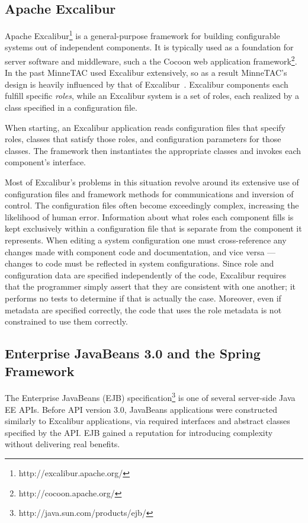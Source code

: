 \documentclass{article}
\begin{document}
\subsection{Apache Excalibur}

Apache Excalibur\footnote{http://excalibur.apache.org/} is a
general-purpose framework for building configurable systems out of
independent components.  It is typically used as a foundation for
server software and middleware, such a the Cocoon web application
framework\footnote{http://cocoon.apache.org/}.  In the past MinneTAC
used Excalibur extensively, so as a result MinneTAC's design is heavily
influenced by that of Excalibur~\cite{ecra07}.  Excalibur components
each fulfill specific \emph{roles}, while an Excalibur system is a set
of roles, each realized by a class specified in a configuration file.

When starting, an Excalibur application reads configuration files that
specify roles, classes that satisfy those roles, and configuration
parameters for those classes.  The framework then instantiates the
appropriate classes and invokes each component's interface.

Most of Excalibur's problems in this situation revolve around
its extensive use of configuration files and framework methods for
communications and inversion of control.  The configuration files often become exceedingly complex, increasing the likelihood of human error.
Information about what roles
each component fills is kept exclusively within a configuration file that
is separate from the component it represents.  When editing a system
configuration one must cross-reference any changes made with component
code and documentation, and vice versa --- changes to code must be
reflected in system configurations.  Since role and configuration data
are specified independently of the code, Excalibur requires that the
programmer simply assert that they are consistent with one another;
it performs no tests to determine if that is actually the case.  Moreover,
even if metadata are specified correctly, the code that uses the role metadata is not constrained to use them correctly.

\subsection{Enterprise JavaBeans 3.0 and the Spring Framework}

The Enterprise JavaBeans (EJB)
specification\footnote{http://java.sun.com/products/ejb/} is one of
several server-side Java EE APIs.  Before API version 3.0, JavaBeans
applications were constructed similarly to Excalibur applications, via
required interfaces and abstract classes specified by the API.  EJB gained
a reputation for introducing complexity without delivering real benefits.
\end{document}
